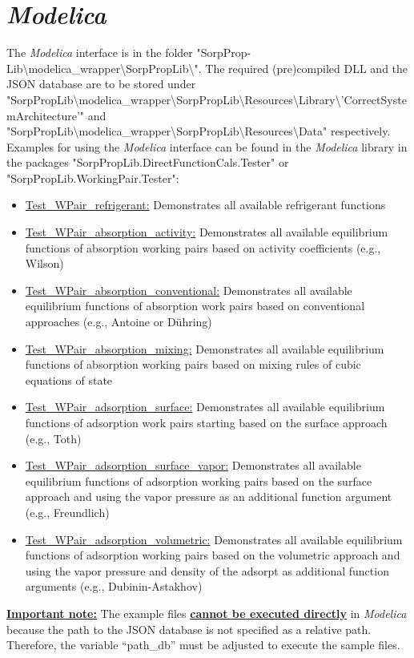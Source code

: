 \section{\textit{Modelica}}
\label{cha:usage:modelica}
%
The \textit{Modelica} interface is in the folder "SorpProp-Lib\textbackslash modelica\_wrapper\textbackslash SorpPropLib\textbackslash ". The required (pre)compiled DLL and the JSON database are to be stored under "SorpPropLib\textbackslash modelica\_wrapper\textbackslash SorpPropLib\textbackslash Resources\textbackslash Library\textbackslash 'CorrectSystemArchitecture'" and "SorpPropLib\textbackslash modelica\_wrapper\textbackslash SorpPropLib\textbackslash Resources\textbackslash Data" respectively. Examples for using the \textit{Modelica} interface can be found in the \textit{Modelica} library in the packages "SorpPropLib.DirectFunctionCals.Tester" or "SorpPropLib.WorkingPair.Tester":
\begin{itemize}
	\item \underline{Test\_WPair\_refrigerant:} Demonstrates all available refrigerant functions
	\item \underline{Test\_WPair\_absorption\_activity:} Demonstrates all available equilibrium functions of absorption working pairs based on activity coefficients (e.g., Wilson)
	\item \underline{Test\_WPair\_absorption\_conventional:} Demonstrates all available equilibrium functions of absorption work pairs based on conventional approaches (e.g., Antoine or Dühring)
	\item \underline{Test\_WPair\_absorption\_mixing:} Demonstrates all available equilibrium functions of absorption working pairs based on mixing rules of cubic equations of state
	\item \underline{Test\_WPair\_adsorption\_surface:} Demonstrates all available equilibrium functions of adsorption work pairs starting based on the surface approach (e.g., Toth)
	\item \underline{Test\_WPair\_adsorption\_surface\_vapor:} Demonstrates all available equilibrium functions of adsorption working pairs based on the surface approach and using the vapor pressure as an additional function argument (e.g., Freundlich)
	\item \underline{Test\_WPair\_adsorption\_volumetric:} Demonstrates all available equilibrium functions of adsorption working pairs based on the volumetric approach and using the vapor pressure and density of the adsorpt as additional function arguments (e.g., Dubinin-Astakhov)
\end{itemize}
\textbf{\underline{Important note:}} The example files \textbf{\underline{cannot be executed directly}} in \textit{Modelica} because the path to the JSON database is not specified as a relative path. Therefore, the variable “path\_db” must be adjusted to execute the sample files.
